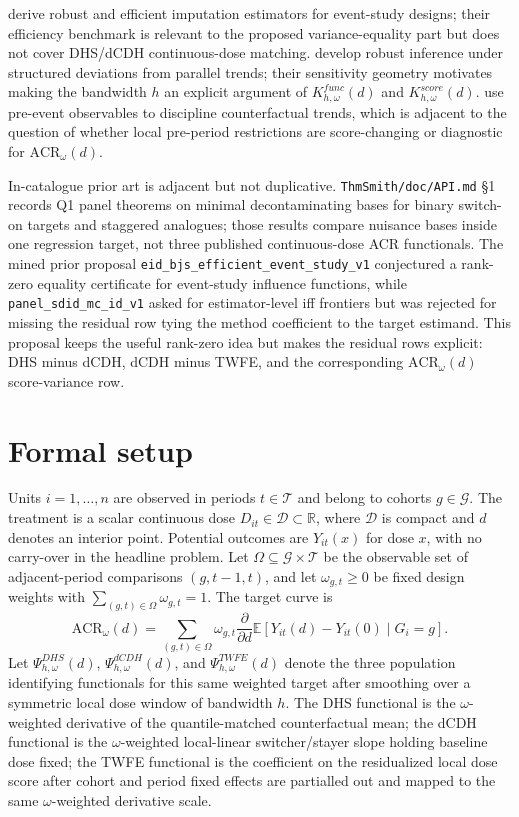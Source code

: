 \documentclass[11pt]{article}
\newcommand{\E}{\mathbb{E}}
\theoremstyle{definition}
\theoremstyle{plain}
\theoremstyle{remark}
\begin{document}
\citet{BorusyakJaravelSpiess2024} derive robust and efficient imputation estimators for event-study designs; their efficiency benchmark is relevant to the proposed variance-equality part but does not cover DHS/dCDH continuous-dose matching.
\citet{RambachanRoth2023} develop robust inference under structured deviations from parallel trends; their sensitivity geometry motivates making the bandwidth \(h\) an explicit argument of \(K^{func}_{h,\omega}(d)\) and \(K^{score}_{h,\omega}(d)\).
\citet{FreyaldenhovenHansenShapiro2019} use pre-event observables to discipline counterfactual trends, which is adjacent to the question of whether local pre-period restrictions are score-changing or diagnostic for \(\mathrm{ACR}_\omega(d)\).

In-catalogue prior art is adjacent but not duplicative. \texttt{ThmSmith/doc/API.md} \S1 records Q1 panel theorems on minimal decontaminating bases for binary switch-on targets and staggered analogues; those results compare nuisance bases inside one regression target, not three published continuous-dose ACR functionals. The mined prior proposal \texttt{eid\_bjs\_efficient\_event\_study\_v1} conjectured a rank-zero equality certificate for event-study influence functions, while \texttt{panel\_sdid\_mc\_id\_v1} asked for estimator-level iff frontiers but was rejected for missing the residual row tying the method coefficient to the target estimand. This proposal keeps the useful rank-zero idea but makes the residual rows explicit: DHS minus dCDH, dCDH minus TWFE, and the corresponding \(\mathrm{ACR}_\omega(d)\) score-variance row.

\section{Formal setup}
Units \(i=1,\ldots,n\) are observed in periods \(t \in \mathcal T\) and belong to cohorts \(g \in \mathcal G\). The treatment is a scalar continuous dose \(D_{it} \in \mathcal D \subset \mathbb R\), where \(\mathcal D\) is compact and \(d\) denotes an interior point. Potential outcomes are \(Y_{it}(x)\) for dose \(x\), with no carry-over in the headline problem. Let \(\Omega\subseteq \mathcal G\times\mathcal T\) be the observable set of adjacent-period comparisons \((g,t-1,t)\), and let \(\omega_{g,t}\ge 0\) be fixed design weights with \(\sum_{(g,t)\in\Omega}\omega_{g,t}=1\). The target curve is
\[
  \mathrm{ACR}_\omega(d) =
  \sum_{(g,t)\in\Omega}\omega_{g,t}
  \frac{\partial}{\partial d}\E[Y_{it}(d)-Y_{it}(0)\mid G_i=g].
\]
Let \(\Psi^{DHS}_{h,\omega}(d)\), \(\Psi^{dCDH}_{h,\omega}(d)\), and \(\Psi^{TWFE}_{h,\omega}(d)\) denote the three population identifying functionals for this same weighted target after smoothing over a symmetric local dose window of bandwidth \(h\). The DHS functional is the \(\omega\)-weighted derivative of the quantile-matched counterfactual mean; the dCDH functional is the \(\omega\)-weighted local-linear switcher/stayer slope holding baseline dose fixed; the TWFE functional is the coefficient on the residualized local dose score after cohort and period fixed effects are partialled out and mapped to the same \(\omega\)-weighted derivative scale.
\end{document}
